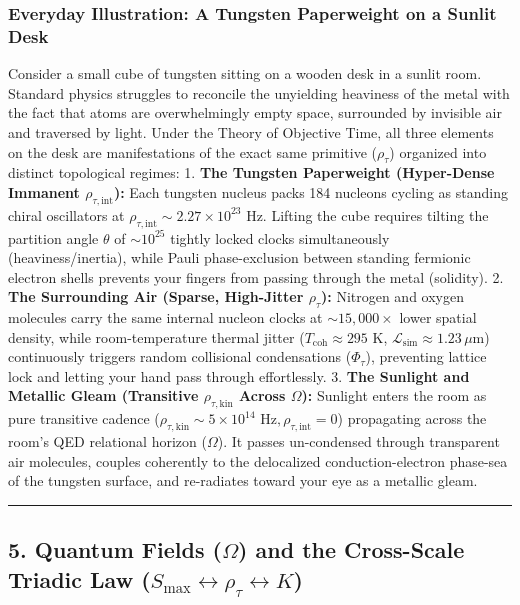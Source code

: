 \documentclass[
]{article}
\begin{document}
\subsubsection{Everyday Illustration: A Tungsten Paperweight on a Sunlit
Desk}\label{everyday-illustration-a-tungsten-paperweight-on-a-sunlit-desk}

Consider a small cube of tungsten sitting on a wooden desk in a sunlit
room. Standard physics struggles to reconcile the unyielding heaviness
of the metal with the fact that atoms are overwhelmingly empty space,
surrounded by invisible air and traversed by light. Under the Theory of
Objective Time, all three elements on the desk are manifestations of the
exact same primitive (\(\rho_\tau\)) organized into distinct topological
regimes: 1. \textbf{The Tungsten Paperweight (Hyper-Dense Immanent
\(\rho_{\tau,\text{int}}\)):} Each tungsten nucleus packs 184 nucleons
cycling as standing chiral oscillators at
\(\rho_{\tau,\text{int}} \sim 2.27 \times 10^{23}\text{ Hz}\). Lifting
the cube requires tilting the partition angle \(\theta\) of
\(\sim 10^{25}\) tightly locked clocks simultaneously
(heaviness/inertia), while Pauli phase-exclusion between standing
fermionic electron shells prevents your fingers from passing through the
metal (solidity). 2. \textbf{The Surrounding Air (Sparse, High-Jitter
\(\rho_\tau\)):} Nitrogen and oxygen molecules carry the same internal
nucleon clocks at \(\sim 15,000\times\) lower spatial density, while
room-temperature thermal jitter
(\(T_{\text{coh}} \approx 295\text{ K}\),
\(\mathcal{L}_{\text{sim}} \approx 1.23\,\mu\text{m}\)) continuously
triggers random collisional condensations (\(\Phi_\tau\)), preventing
lattice lock and letting your hand pass through effortlessly. 3.
\textbf{The Sunlight and Metallic Gleam (Transitive
\(\rho_{\tau,\text{kin}}\) Across \(\Omega\)):} Sunlight enters the room
as pure transitive cadence
(\(\rho_{\tau,\text{kin}} \sim 5 \times 10^{14}\text{ Hz}, \rho_{\tau,\text{int}} = 0\))
propagating across the room's QED relational horizon (\(\Omega\)). It
passes un-condensed through transparent air molecules, couples
coherently to the delocalized conduction-electron phase-sea of the
tungsten surface, and re-radiates toward your eye as a metallic gleam.

\begin{center}\rule{0.5\linewidth}{0.5pt}\end{center}

\subsection{\texorpdfstring{5. Quantum Fields (\(\Omega\)) and the
Cross-Scale Triadic Law
(\(S_{\text{max}} \leftrightarrow \rho_\tau \leftrightarrow K\))}{5. Quantum Fields (\textbackslash Omega) and the Cross-Scale Triadic Law (S\_\{\textbackslash text\{max\}\} \textbackslash leftrightarrow \textbackslash rho\_\textbackslash tau \textbackslash leftrightarrow K)}}\label{quantum-fields-omega-and-the-cross-scale-triadic-law-s_textmax-leftrightarrow-rho_tau-leftrightarrow-k}
\end{document}
